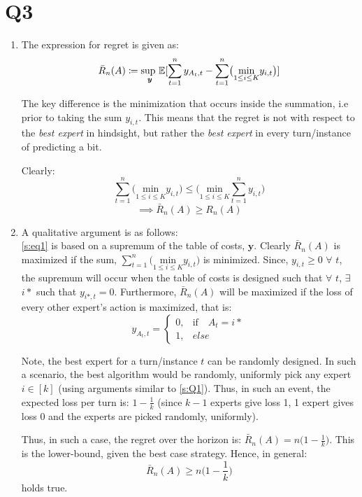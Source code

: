 \section{Q3}
\label{s:Q3}
\begin{enumerate}[label=(\alph*)]
\item 
The expression for regret is given as:
\begin{equation}
\label{s:eq1}
\bar{R}_n(A) \coloneqq \underset{\bm{y}}{\textrm{sup }}\mathbb{E}[\sum_{t = 1}^{n}y_{A_t, t} - \sum_{t = 1}^{n}\bigl( \underset{1 \leq i \leq K}{\textrm{min}} y_{i,t} \bigr)]
\end{equation}

The key difference is the minimization that occurs inside the summation, i.e prior to taking the sum $y_{i,t}$. This means that the regret is not with respect to the \emph{best expert} in hindsight, but rather the \emph{best expert} in every turn/instance of predicting a bit.

Clearly:
$$
\sum_{t = 1}^{n}\bigl( \underset{1 \leq i \leq K}{\textrm{min}} y_{i,t} \bigr) \leq \bigl( \underset{1 \leq i \leq K}{\textrm{min}}  \sum_{t = 1}^{n}y_{i,t} \bigr)$$
$$\implies \bar{R}_n(A) \geq R_n(A)$$

\item A qualitative argument is as follows: \\

\eqref{s:eq1} is based on a supremum of the table of costs, $\bm{y}$. Clearly $\bar{R}_n(A)$ is maximized if the sum, $ \sum_{t = 1}^{n}\bigl( \underset{1 \leq i \leq K}{\textrm{min}} y_{i,t} \bigr)$ is minimized. Since, $y_{i,t} \geq 0$  $\forall$ $t$, the supremum will occur when the table of costs is designed such that $\forall$ $t$, $\exists$ $i*$ such that $y_{i*,t} = 0$. Furthermore, $\bar{R}_n(A)$ will be maximized if the loss of every other expert's action is maximized, that is:
\[
    y_{A_t,t} = 
\begin{cases}
    0,& \textrm{if} \quad A_t = i*\\
    1,& else \quad 
\end{cases}
\] 

Note, the best expert for a turn/instance $t$ can be randomly designed. In such a scenario, the best algorithm would be randomly, uniformly pick any expert $i \in [k]$ (using arguments similar to \ref{s:Q1}). Thus, in such an event, the expected loss per turn is: $1-\frac{1}{k}$ (since $k-1$ experts give loss 1, 1 expert gives loss 0 and the experts are picked randomly, uniformly).

Thus, in such a case, the regret over the horizon is: $\bar{R}_n(A) = n\bigl(1 - \frac{1}{k}\bigr)$. This is the lower-bound, given the best case strategy. Hence, in general:
$$
\bar{R}_n(A) \geq n\bigl(1 - \frac{1}{k}\bigr)
$$
holds true.

\end{enumerate}
